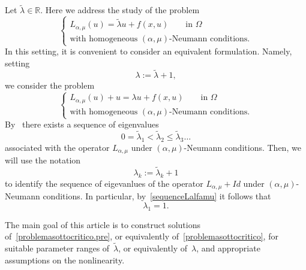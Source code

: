 \documentclass[12pt,a4paper,intlimits,sumlimits]{amsart}
\def \R {\mathbb{R}}
\theoremstyle{definition}
\theoremstyle{plain}
\numberwithin{equation}{section}
\renewcommand{\le}{\leqslant}
\begin{document}
Let $\widetilde\lambda\in\R$. Here we address the study of the problem
\begin{equation}\label{problemasottocritico.pre}
\begin{cases}
L_{\alpha,\mu}(u)=\widetilde \lambda u +f(x,u) \qquad \mbox{in }\Omega
\\
\mbox{with homogeneous } (\alpha,\mu)\mbox{-Neumann conditions.}
\end{cases}
\end{equation}
In this setting, it is convenient to consider an equivalent formulation. Namely, setting
\begin{equation}\label{lambdadefn}
\lambda:=\widetilde\lambda+1,
\end{equation}
we consider the problem
\begin{equation}\label{problemasottocritico}
\begin{cases}
L_{\alpha,\mu}(u)+u=\lambda u +f(x,u)  \qquad \mbox{in }\Omega
\\
\mbox{with homogeneous } (\alpha,\mu)\mbox{-Neumann conditions.}
\end{cases}
\end{equation}
By~\cite[Theorem~1.5]{TUTTI} there exists a sequence of eigenvalues
\begin{equation}\label{sequenceLalfamu}
0=\widetilde\lambda_1 < \widetilde\lambda_2\le\widetilde\lambda_3\dots
\end{equation}
associated with the operator $L_{\alpha,\mu}$ under $(\alpha,\mu)$-Neumann conditions. Then, we will use the notation 
\begin{equation}\label{eigennotation}
\lambda_k:=\widetilde \lambda_k+1
\end{equation}
to identify the sequence of eigevanlues of the operator $L_{\alpha,\mu}+Id$ under $(\alpha,\mu)$-Neumann conditions. In particular, by~\eqref{sequenceLalfamu} it follows that
\begin{equation}\label{primouguale1}
\lambda_1 = 1.
\end{equation}
\medskip

The main goal of this article is to construct solutions of~\eqref{problemasottocritico.pre},
or equivalently of~\eqref{problemasottocritico}, for suitable parameter ranges of~$\widetilde\lambda$, or equivalently of~$\lambda$,
and appropriate
assumptions on the nonlinearity.
\end{document}

